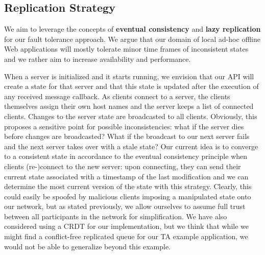 \subsection{Replication Strategy}

We aim to leverage the concepts of \textbf{eventual consistency} and \textbf{lazy replication} for our fault tolerance approach. 
We argue that our domain of local ad-hoc offline Web applications will mostly tolerate minor time frames of inconsistent states and we rather aim to increase availability and performance.

When a server is initialized and it starts running, we envision that our API will create a state for that server and that this state is updated after the execution of any received message callback. 
As clients connect to a server, the clients themselves assign their own host names and the server keeps a list of connected clients.
Changes to the server state are broadcasted to all clients. 
Obviously, this proposes a sensitive point for possible inconsistencies: what if the server dies before changes are broadcasted? 
What if the broadcast to our next server fails and the next server takes over with a stale state? 
Our current idea is to converge to a consistent state in accordance to the eventual consistency principle when clients (re-)connect to the new server: upon connecting, they can send their current state associated with a timestamp of the last modification and we can determine the most current version of the state with this strategy.
Clearly, this could easily be spoofed by malicious clients imposing a manipulated state onto our network, but as stated previously, we allow ourselves to assume full trust between all participants in the network for simplification. 
We have also considered using a CRDT for our implementation, but we think that while we might find a conflict-free replicated queue for our TA example application, we would not be able to generalize beyond this example.